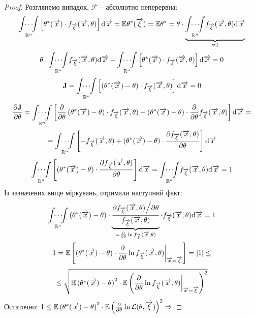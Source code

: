 \begin{spacing}{1}
\begin{proof}
 \def\fxthetaA{f_{\overrightarrow{\xi}} (\overrightarrow{x}, \theta)}
	Розглянемо випадок, $\mathcal{F}$ -- абсолютно неперервна:
	$$
	\underset{\mathbb{R}^n}{\infigral} \left[ \theval(\overrightarrow{x}) \cdot \fxthetaA  \right]\mathrm{d} \overrightarrow{x}
	= \mathbb{E} \theval ( \overrightarrow{\xi}) = \mathbb{E} \theval = \theta \cdot
\underbrace{	\underset{\mathbb{R}^n}{\infigral} \fxthetaA \mathrm{d} \overrightarrow{x}}_{= 1}
	$$
	$$
	\theta \cdot\underset{\mathbb{R}^n}{\infigral} \fxthetaA \mathrm{d} \overrightarrow{x} - \underset{\mathbb{R}^n}{\infigral} \left[ \theval(\overrightarrow{x}) \cdot \fxthetaA  \right]\mathrm{d} \overrightarrow{x} = 0
	$$
	$$
		\mathbf{J} = \underset{\mathbb{R}^n}{\infigral} \left[\left(  \theval(\overrightarrow{x}) - \theta \right) \cdot \fxthetaA  \right]\mathrm{d} \overrightarrow{x} = 0
	$$
	$$
	\frac{\d \mathbf{J}}{\d \theta} = \underset{\mathbb{R}^n}{\infigral} \left[ 	\frac{\d }{\d \theta}\left(  \theval(\overrightarrow{x}) - \theta \right) \cdot \fxthetaA + \left(  \theval(\overrightarrow{x}) - \theta \right) \cdot \frac{\d }{\d \theta} \fxthetaA  \right]\mathrm{d} \overrightarrow{x} =
	$$
	$$
	= \underset{\mathbb{R}^n}{\infigral} \left[ - \fxthetaA + \left(  \theval(\overrightarrow{x}) - \theta \right) \cdot \frac{\d \fxthetaA }{\d \theta}  \right]\mathrm{d} \overrightarrow{x}
	$$
	$$
 \underset{\mathbb{R}^n}{\infigral} \left[ \left(  \theval(\overrightarrow{x}) - \theta \right) \cdot \frac{\d \fxthetaA }{\d \theta}  \right]\mathrm{d} \overrightarrow{x}
	=
	\underset{\mathbb{R}^n}{\infigral} \fxthetaA  \mathrm{d} \overrightarrow{x} = 1
	$$
	Із зазначених вище міркувань, отримали наступний факт:
	$$
\begin{gathered}
\underset{\mathbb{R}^n}{\infigral}  \left(  \theval(\overrightarrow{x}) - \theta \right) \cdot
 \underbrace{\frac{\d \fxthetaA \Big/ \d \theta }{\fxthetaA}}_{= \frac{\d }{\d \theta}\ln \fxthetaA } \cdot \fxthetaA  \mathrm{d} \overrightarrow{x}  = 1\\
1 = \mathbb{E}  \left[ \left(  \theval(\overrightarrow{x}) - \theta \right) \cdot \frac{\d }{\d \theta}\ln \fxthetaA \bigg|_{\overrightarrow{x} = \overrightarrow{\xi}}  \right]= |1|  \leq
\end{gathered}
	$$
	$$
	\leq  \sqrt{  \mathbb{E}
\left(  \theval(\overrightarrow{x}) - \theta \right)^2
 \cdot \mathbb{E} \left( \frac{\d }{\d \theta}\ln \fxthetaA \bigg|_{\overrightarrow{x} = \overrightarrow{\xi}} \right)^2}
	$$
	Остаточно: $1 \leq \mathbb{E} \left( \theta^*(\overrightarrow{x}) - \theta \right)^2 \cdot
	\mathbb{E} \left( \frac{\partial}{\partial \theta} \ln \mathcal{L}(\theta, \overrightarrow{\xi}) \right)^2 \Rightarrow $
\end{proof}
\end{spacing}
